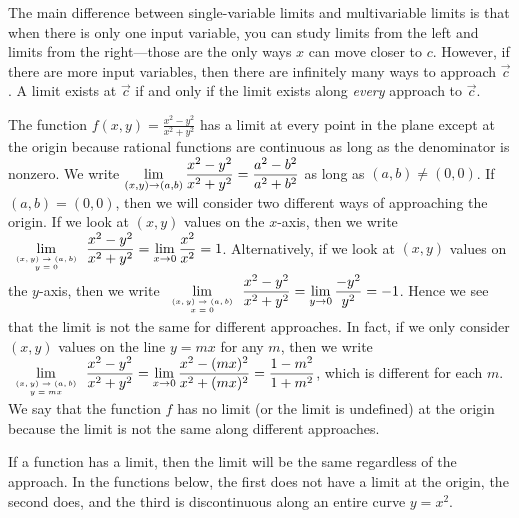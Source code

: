 The main difference between single-variable limits and multivariable
limits is that when there is only one input variable, you can study
limits from the left and limits from the right---those are the only
ways $x$ can move closer to $c$.  However, if there are more input
variables, then there are infinitely many ways to approach $\vec c$. A
limit exists at $\vec c$ if and only if the limit exists along
\emph{every} approach to $\vec c$.  

\begin{example}
The function $f(x,y)
= \frac{x^2-y^2}{x^2+y^2}$ has a limit at every point in the plane
except at the origin because rational functions are continuous as long
as the denominator is nonzero.  We write $\displaystyle
\lim_{(x,y)\to(a,b)}\frac{x^2-y^2}{x^2+y^2}=\frac{a^2-b^2}{a^2+b^2}$ as
long as $(a,b)\neq(0,0)$.  If $(a,b)=(0,0)$, then we will consider two
different ways of approaching the origin.  If we look at $(x,y)$
values on the $x$-axis, then we write $\displaystyle
\lim_{\text{\tiny$\begin{array}{c} (x,y)\to(a,b)\\y=0
\end{array}$}} 
\frac{x^2-y^2}{x^2+y^2} = \lim_{x\to 0} \frac{x^2}{x^2}=1$.
Alternatively, if we look at $(x,y)$ values on the $y$-axis, then we
write 
$\displaystyle \lim_{\text{\tiny$\begin{array}{c}
 (x,y)\to(a,b)\\x=0
\end{array}$}} \frac{x^2-y^2}{x^2+y^2} = \lim_{y\to 0}
\frac{-y^2}{y^2}=-1$. Hence we see that the limit is not the
same for different approaches.  In fact, if we only consider $(x,y)$
values on the line $y=mx$ for any $m$, then we write 
$\displaystyle \lim_{\text{\tiny$\begin{array}{c}
 (x,y)\to(a,b)\\y=mx
\end{array}$}} \frac{x^2-y^2}{x^2+y^2} = \lim_{x\to 0}
\frac{x^2-(mx)^2}{x^2+(mx)^2}=\frac{1-m^2}{1+m^2}$, which is different
for each $m$. We say that the function $f$ has no limit (or the limit is undefined) at the
origin because the limit is not the same along different approaches. 
\end{example}

If a function has a limit, then the limit will be the same regardless
of the approach. In the functions below, the first does not have a
limit at the origin, the second does, and the third is discontinuous
along an entire curve $y=x^2$.

